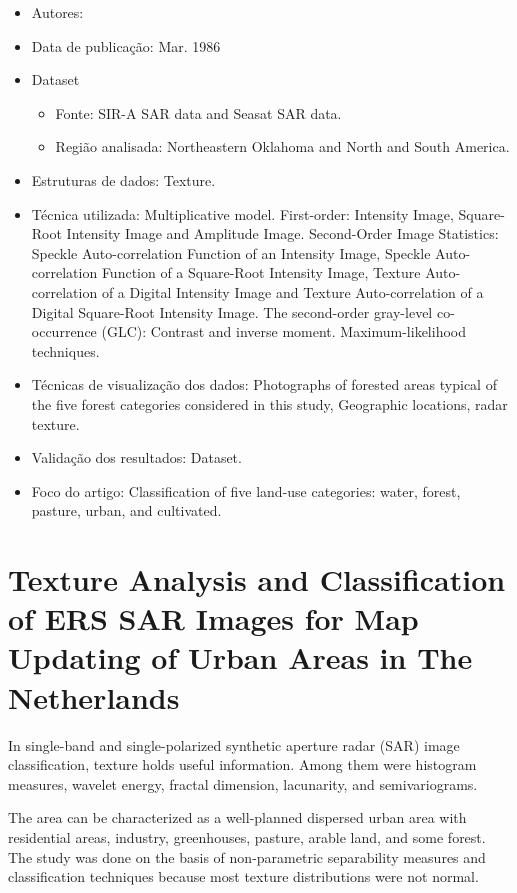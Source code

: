 \documentclass[paper=a4, fontsize=11pt]{scrartcl}
\begin{document}
\begin{itemize}
    \item Autores:~\cite{ulaby1986textural}
    \item Data de publicação: Mar. 1986
    \item Dataset
    \begin{itemize}
        \item Fonte: SIR-A SAR data and Seasat SAR data.
        \item Região analisada: Northeastern Oklahoma and North and South America.
    \end{itemize}
    \item Estruturas de dados: Texture. 
    \item Técnica utilizada: Multiplicative model. First-order: Intensity Image, Square-Root Intensity Image and Amplitude Image. Second-Order Image Statistics: Speckle Auto-correlation Function of an Intensity Image, Speckle Auto-correlation Function of a Square-Root Intensity Image, Texture Auto-correlation of a Digital Intensity Image and Texture Auto-correlation of a Digital Square-Root Intensity Image. The second-order gray-level co-occurrence (GLC): Contrast and inverse moment. Maximum-likelihood techniques.
    \item Técnicas de visualização dos dados: Photographs of forested areas typical of the five forest categories considered in this study, Geographic locations, radar texture.
    \item Validação dos resultados: Dataset.
    \item Foco do artigo: Classification of five land-use categories: water, forest, pasture, urban, and cultivated.
\end{itemize}

\newpage

\section*{\textcolor{VioletRed4}{Texture Analysis and Classification of ERS SAR Images for Map Updating of Urban Areas in The Netherlands}}

In single-band and single-polarized synthetic aperture radar (SAR) image classification, texture holds useful information.
Among them were histogram measures, wavelet energy, fractal dimension, lacunarity, and semivariograms.

The area can be characterized as a well-planned dispersed urban area with residential areas, industry, greenhouses, pasture, arable land, and some forest.
The study was done on the basis of non-parametric separability measures and classification techniques because most texture distributions were not normal.
\end{document}
